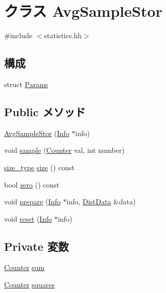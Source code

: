 \hypertarget{classStats_1_1AvgSampleStor}{
\section{クラス AvgSampleStor}
\label{classStats_1_1AvgSampleStor}
}


{\ttfamily \#include $<$statistics.hh$>$}\subsection*{構成}
\begin{DoxyCompactItemize}
\item 
struct \hyperlink{structStats_1_1AvgSampleStor_1_1Params}{Params}
\end{DoxyCompactItemize}
\subsection*{Public メソッド}
\begin{DoxyCompactItemize}
\item 
\hyperlink{classStats_1_1AvgSampleStor_a77c6cc4f1040b08cf4704c20f1c1cf43}{AvgSampleStor} (\hyperlink{classStats_1_1Info}{Info} $\ast$info)
\item 
void \hyperlink{classStats_1_1AvgSampleStor_a57fea70de4ed8fee9ec9e9d9cca6f9fa}{sample} (\hyperlink{namespaceStats_ac35128c026c72bb36af9cea00774e8a6}{Counter} val, int number)
\item 
\hyperlink{namespaceStats_ada51e68d31936547d3729c82daf6b7c6}{size\_\-type} \hyperlink{classStats_1_1AvgSampleStor_a503ab01f6c0142145d3434f6924714e7}{size} () const 
\item 
bool \hyperlink{classStats_1_1AvgSampleStor_a4e72b01b727d3165e75cba84eb507491}{zero} () const 
\item 
void \hyperlink{classStats_1_1AvgSampleStor_a2e5e3cd36b4a3d6ab774aed4e3fcd641}{prepare} (\hyperlink{classStats_1_1Info}{Info} $\ast$info, \hyperlink{structStats_1_1DistData}{DistData} \&data)
\item 
void \hyperlink{classStats_1_1AvgSampleStor_a10d9d71be6e0d2194999bb5dd5280e2d}{reset} (\hyperlink{classStats_1_1Info}{Info} $\ast$info)
\end{DoxyCompactItemize}
\subsection*{Private 変数}
\begin{DoxyCompactItemize}
\item 
\hyperlink{namespaceStats_ac35128c026c72bb36af9cea00774e8a6}{Counter} \hyperlink{classStats_1_1AvgSampleStor_ab5b201cce7e10c48f62b71605e75707e}{sum}
\item 
\hyperlink{namespaceStats_ac35128c026c72bb36af9cea00774e8a6}{Counter} \hyperlink{classStats_1_1AvgSampleStor_a0c02ec1e072d692448ce4429a78e3675}{squares}
\end{DoxyCompactItemize}



